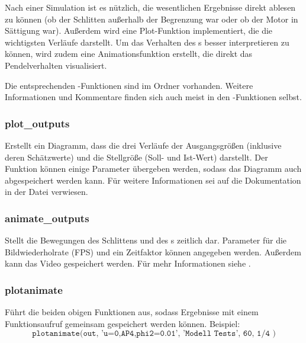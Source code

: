 Nach einer Simulation ist es nützlich, die wesentlichen Ergebnisse direkt ablesen zu können (\zB ob der Schlitten außerhalb der Begrenzung war oder ob der Motor in Sättigung war).
Außerdem wird eine Plot-Funktion implementiert, die die wichtigsten Verläufe darstellt.
Um das Verhalten des \dpd s besser interpretieren zu können, wird zudem eine Animationsfunktion erstellt, die direkt das Pendelverhalten visualisiert.

Die entsprechenden \ml-Funktionen sind im Ordner  vorhanden.
Weitere Informationen und Kommentare finden sich auch meist in den \ml-Funktionen selbst.

\subsubsection{plot\_outputs}
Erstellt ein Diagramm, dass die drei Verläufe der Ausgangsgrößen (inklusive deren Schätzwerte) und die Stellgröße (Soll- und Ist-Wert) darstellt.
Der Funktion können einige Parameter übergeben werden, sodass das Diagramm auch abgespeichert werden kann.
Für weitere Informationen sei auf die Dokumentation in der Datei  verwiesen.

\subsubsection{animate\_outputs}
Stellt die Bewegungen des Schlittens und des \dpd s zeitlich dar.
Parameter für die Bildwiederholrate (FPS) und ein Zeitfaktor können angegeben werden.
Außerdem kann das Video gespeichert werden.
Für mehr Informationen siehe .

\subsubsection{plotanimate}
Führt die beiden obigen Funktionen aus, sodass Ergebnisse mit einem Funktionsaufruf gemeinsam gespeichert werden können.
Beispiel:
	\[
	\texttt{plotanimate(out, 'u=0,AP4,phi2=0.01', 'Modell Tests', 60, 1/4 )}
\]




